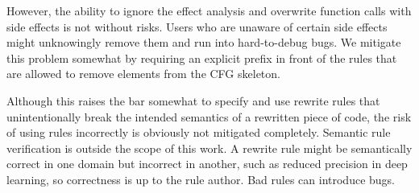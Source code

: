 However, the ability to ignore the effect analysis and overwrite function calls with side effects is not without risks.
Users who are unaware of certain side effects might unknowingly remove them and run into hard-to-debug bugs.
We mitigate this problem somewhat by requiring an explicit prefix  in front of the rules that are allowed to remove elements from the CFG skeleton.

Although this raises the bar somewhat to specify and use rewrite rules that unintentionally break the intended semantics of a rewritten piece of code, the risk of using rules incorrectly is obviously not mitigated completely. Semantic rule verification is outside the scope of this work. A rewrite rule might be semantically correct in one domain but incorrect in another, such as reduced precision in deep learning, so correctness is up to the rule author. Bad rules can introduce bugs.


